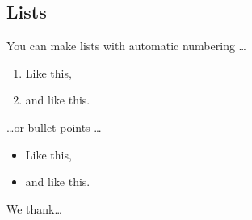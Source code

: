\documentclass[twocolumn,showpacs,%
  nofootinbib,aps,superscriptaddress,%
  eqsecnum,prd,notitlepage,showkeys,10pt]{revtex4-1}
\begin{document}
\subsection{Lists}

You can make lists with automatic numbering \dots

\begin{enumerate}
\item Like this,
\item and like this.
\end{enumerate}
\dots or bullet points \dots
\begin{itemize}
\item Like this,
\item and like this.
\end{itemize}

\begin{acknowledgments}

We thank\dots

\end{acknowledgments}
\end{document}
